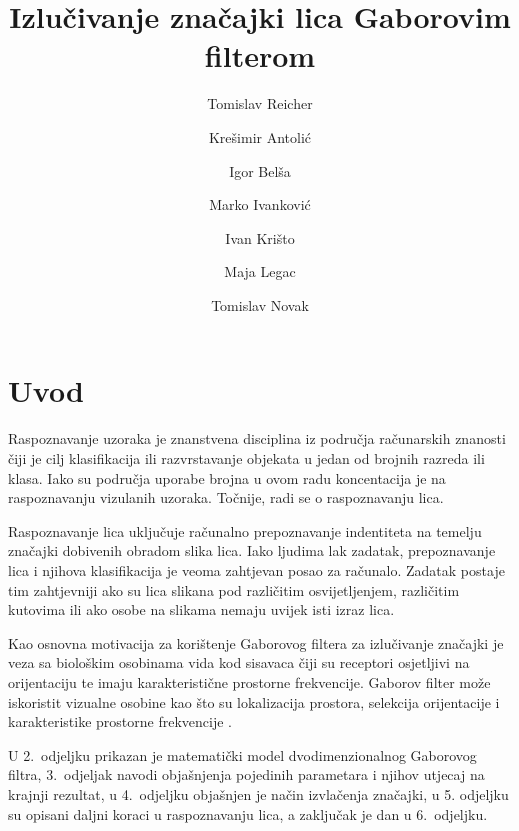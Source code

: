 \documentclass{article}
\begin{document}
\title{Izlučivanje značajki lica Gaborovim filterom}
\author{Tomislav Reicher \and Krešimir Antolić \and Igor Belša \and Marko Ivanković \and Ivan Krišto \and Maja Legac \and Tomislav Novak}

\maketitle

\tableofcontents

\newpage
\section{Uvod}
Raspoznavanje uzoraka je znanstvena disciplina iz područja računarskih znanosti
čiji je cilj klasifikacija ili razvrstavanje objekata u jedan od brojnih razreda
ili klasa. Iako su područja uporabe brojna u ovom radu koncentacija je na
raspoznavanju vizulanih uzoraka. Točnije, radi se o raspoznavanju lica.

Raspoznavanje lica uključuje računalno prepoznavanje indentiteta na temelju
značajki dobivenih obradom slika lica. Iako ljudima lak zadatak, prepoznavanje
lica i njihova klasifikacija je veoma zahtjevan posao za računalo. Zadatak
postaje tim zahtjevniji ako su lica slikana pod različitim osvijetljenjem,
različitim kutovima ili ako osobe na slikama nemaju uvijek isti izraz lica.

Kao osnovna motivacija za korištenje Gaborovog filtera za izlučivanje značajki je
veza sa biološkim osobinama vida kod sisavaca čiji su receptori osjetljivi na
orijentaciju te imaju karakteristične prostorne frekvencije. Gaborov filter može
iskoristit vizualne osobine kao što su lokalizacija prostora, selekcija
orijentacije i karakteristike prostorne frekvencije
\citep{bhuiyan2007onfacerecognition}\nocite{daugman1985uncertainty}.

U 2.~odjeljku prikazan je matematički model dvodimenzionalnog Gaborovog filtra,
3.~odjeljak navodi objašnjenja pojedinih parametara i njihov utjecaj na krajnji rezultat, 
u 4.~odjeljku objašnjen je način izvlačenja značajki, 
u 5. odjeljku su opisani daljni koraci u raspoznavanju lica, a zaključak je dan u 6.~odjeljku.

\newpage
\end{document}
